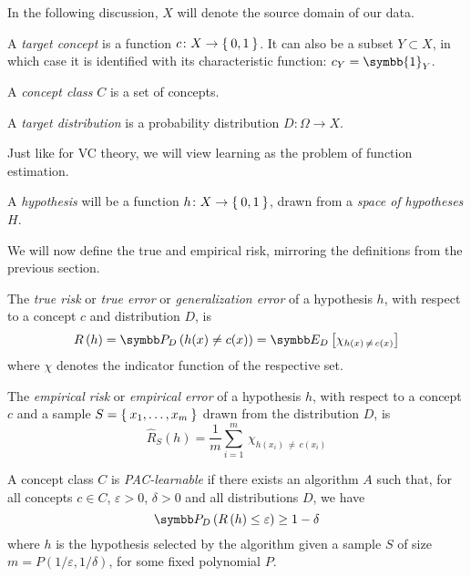 In the following discussion, \(X\) will denote the source domain of our data.

\begin{definition}
A \emph{target concept} is a function \(c \colon X \to \Set{ 0, 1 }\). It can also be a subset \(Y \subset X\), in which case it is identified with its characteristic function: \(c_Y = \symbb{1}_Y\).
\end{definition}

\begin{definition}
A \emph{concept class} \(C\) is a set of concepts.
\end{definition}

\begin{definition}
A \emph{target distribution} is a probability distribution \(D \colon \Omega \to X\).
\end{definition}

Just like for VC theory, we will view learning as the problem of function estimation.

\begin{definition}
A \emph{hypothesis} will be a function \(h \colon X \to \Set{ 0, 1 }\), drawn from a \emph{space of hypotheses} \(H\).
\end{definition}

We will now define the true and empirical risk, mirroring the definitions from the previous section.

\begin{definition}
The \emph{true risk} or \emph{true error} or \emph{generalization error} of a hypothesis \(h\), with respect to a concept \(c\) and distribution \(D\), is
\[
    R \left(h\right) = \probability_{D} \left(h(x) \neq c(x)\right) = \expectedvalue_{D} \left[\chi_{h(x) \, \neq \, c(x)}\right]
\]
where \(\chi\) denotes the indicator function of the respective set.
\end{definition}

\begin{definition}
The \emph{empirical risk} or \emph{empirical error} of a hypothesis \(h\), with respect to a concept \(c\) and a sample \(S = \Set{ x_1, \dots, x_m }\) drawn from the distribution \(D\), is
\[
    \widehat{R}_S \left(h\right) = \frac{1}{m} \sum_{i = 1}^{m} \, \chi_{h(x_i) \, \neq \, c(x_i)}
\]
\end{definition}

\begin{definition}
\label{def:pac_learnable}

A concept class \(C\) is \emph{PAC-learnable} if there exists an algorithm \(A\) such that, for all concepts \(c \in C\), \(\varepsilon > 0\), \(\delta > 0\) and all distributions \(D\), we have
\[
    \probability_{D} \left(R\left(h\right) \leq \varepsilon\right) \geq 1 - \delta
\]
where \(h\) is the hypothesis selected by the algorithm given a sample \(S\) of size \(m = P\left(1/\varepsilon, 1/\delta\right)\), for some fixed polynomial \(P\).
\end{definition}

